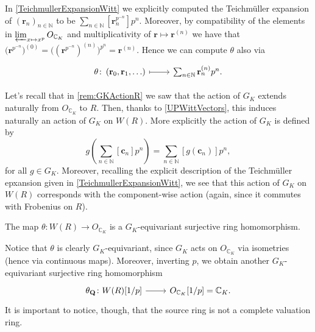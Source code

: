 \begin{rem}[]
	In \cref{TeichmullerExpansionWitt} we explicitly computed the Teichmüller
	expansion of $\left( \mathbf{r}_n \right)_{n \in \mathbb{N}}$
	to be $\sum_{n \in \mathbb{N} }^{  } [\mathbf{r}_n^{p^{-n}}] p^n$.
	Moreover, by compatibility of the elements in $\varprojlim_{x \mapsto x^p} O_{\mathbb{C}_K}$
	and multiplicativity of $\mathbf{r} \mapsto \mathbf{r}^{(n)}$
	we have that $\big( \mathbf{r}^{p^{-n}} \big)^{(0)} = \big( (\mathbf{r}^{p^{-n}})^{(n)} \big)^{p^n} =
	\mathbf{r}^{(n)}$.
	Hence we can compute $\theta$ also via
	\begin{equation*}
	\begin{tikzcd}
		\theta\colon 
		\left( \mathbf{r}_0, \mathbf{r}_1, \ldots \right)
		\arrow[r, "", mapsto] &
		\sum_{n \in \mathbb{N} }^{  } \mathbf{r}_n^{(n)} p^n
	.\end{tikzcd}
	\end{equation*}
\end{rem}


\begin{rem}[]\label{GKActionWR}
	Let's recall that in \cref{rem:GKActionR} we saw that
	the action of $G_K$ extends naturally from $O_{\mathbb{C}_K}$ to $R$.
	Then, thanks to \cref{UPWittVectors}, this induces naturally
	an action of $G_K$ on $W(R)$.
	More explicitly the action of $G_K$ is defined by
	\begin{equation*}
		g \left( \sum_{n \in \mathbb{N} }^{  } [\mathbf{c}_n] p^n \right) =
		\sum_{n \in \mathbb{N} }^{  } [g(\mathbf{c}_n)] p^n
	,\end{equation*}
	for all $g \in G_K$.
	Moreover, recalling the explicit description of the Teichmüller
	epxansion given in \cref{TeichmullerExpansionWitt}, we see that this
	action of $G_K$ on $W(R)$ corresponds with the component-wise action
	(again, since it commutes with Frobenius on $R$).
\end{rem}


\begin{lem}
	The map $\theta\colon W(R) \to O_{\mathbb{C}_K}$ is a $G_K$-equivariant surjective ring homomorphism.
\end{lem} 


\begin{rem}[]
	Notice that $\theta$ is clearly $G_K$-equivariant, since $G_K$ acts on $O_{\mathbb{C}_K}$
	via isometries (hence via continuous maps).
	Moreover, inverting $p$, we obtain another $G_K$-equivariant surjective ring homomorphism
	\begin{equation*}
	\begin{tikzcd}[row sep = 0ex
		,/tikz/column 1/.append style={anchor=base east}
		,/tikz/column 2/.append style={anchor=base west}]
		\theta_{\mathbf{Q}}\colon W(R)[1/p] \arrow[r, "", rightarrow] &
		O_{\mathbb{C}_K}[1/p] = \mathbb{C}_K
	.\end{tikzcd}
	\end{equation*} 
	It is important to notice, though, that the source ring is not a complete valuation ring.
\end{rem}


